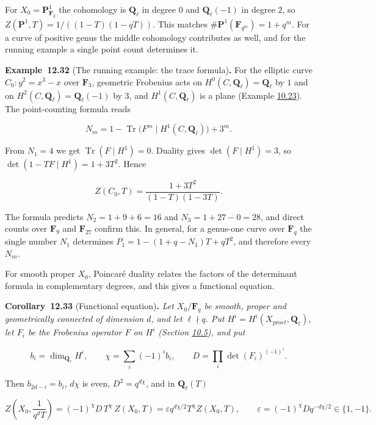 \documentclass[11pt]{article}
\newenvironment{bpstatement}[2]{\par\addvspace{0.6\baselineskip}\noindent\textbf{#1}#2\textbf{.}\enspace\ignorespaces}
  {\par\addvspace{0.4\baselineskip}}
\newenvironment{bpstatementit}[2]{\begin{bpstatement}{#1}{#2}\itshape\ignorespaces}{\end{bpstatement}}
\begin{document}
For \(X_0=\mathbf P^1_{\mathbf F_q}\) the cohomology is \(\mathbf Q_\ell\) in degree \(0\) and \(\mathbf Q_\ell(-1)\) in degree \(2\), so \(Z(\mathbf P^1,T)=1/((1-T)(1-qT))\). This matches \(\#\mathbf P^1(\mathbf F_{q^m})=1+q^m\). For a curve of positive genus the middle cohomology contributes as well, and for the running example a single point count determines it.

\label{bp323}%
\begin{bpstatement}{Example~12.32}{ (The running example: the trace formula)}
For the elliptic curve \(C_0\colon y^2=x^3-x\) over \(\mathbf F_3\), geometric Frobenius acts on \(H^0(C,\mathbf Q_\ell)=\mathbf Q_\ell\) by \(1\) and on \(H^2(C,\mathbf Q_\ell)=\mathbf Q_\ell(-1)\) by \(3\), and \(H^1(C,\mathbf Q_\ell)\) is a plane (Example \hyperref[bp169]{10.23}). The point-counting formula reads

\[
N_m=1-\operatorname{Tr}\bigl(F^m\mid H^1(C,\mathbf Q_\ell)\bigr)+3^m .
\]

From \(N_1=4\) we get \(\operatorname{Tr}(F\mid H^1)=0\). Duality gives \(\det(F\mid H^1)=3\), so \(\det(1-TF\mid H^1)=1+3T^2\). Hence

\[
Z(C_0,T)=\frac{1+3T^2}{(1-T)(1-3T)}.
\]

The formula predicts \(N_2=1+9+6=16\) and \(N_3=1+27-0=28\), and direct counts over \(\mathbf F_9\) and \(\mathbf F_{27}\) confirm this. In general, for a genus-one curve over \(\mathbf F_q\) the single number \(N_1\) determines \(P_1=1-(1+q-N_1)T+qT^2\), and therefore every \(N_m\).
\end{bpstatement}

\label{bp324}%
For smooth proper \(X_0\), Poincaré duality relates the factors of the determinant formula in complementary degrees, and this gives a functional equation.

\label{bp325}%
\begin{bpstatementit}{Corollary~12.33}{ (Functional equation)}
Let \(X_0/\mathbf F_q\) be smooth, proper and geometrically connected of dimension \(d\), and let \(\ell\nmid q\). Put \(H^i=H^i(X_{\mathrm{pro}\acute{e}t},\mathbf Q_\ell)\), let \(F_i\) be the Frobenius operator \(F\) on \(H^i\) (Section \hyperref[bp154]{10.5}), and put

\[
b_i=\dim_{\mathbf Q_\ell}H^i,\qquad \chi=\sum_i(-1)^ib_i,\qquad
D=\prod_i\det(F_i)^{(-1)^i}.
\]

Then \(b_{2d-i}=b_i\), \(d\chi\) is even, \(D^2=q^{d\chi}\), and in \(\mathbf Q_\ell(T)\)

\[
Z\!\left(X_0,\frac1{q^dT}\right)=(-1)^{\chi}D\,T^{\chi}\,Z(X_0,T)
=\varepsilon q^{d\chi/2}T^{\chi}Z(X_0,T),
\qquad \varepsilon=(-1)^\chi Dq^{-d\chi/2}\in\{1,-1\}.
\]
\end{bpstatementit}
\end{document}
